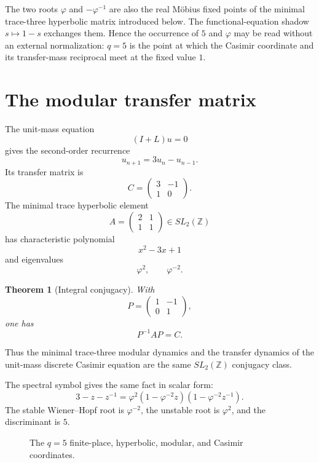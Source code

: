 \documentclass[11pt]{article}
\newtheorem{theorem}{Theorem}[section]
\theoremstyle{definition}
\theoremstyle{remark}
\DeclareMathOperator{\artanh}{artanh}
\begin{document}
The two roots \(\varphi\) and \(-\varphi^{-1}\) are also the real Möbius fixed points of the minimal trace-three hyperbolic matrix introduced below.  The functional-equation shadow \(s\mapsto1-s\) exchanges them.  Hence the occurrence of \(5\) and \(\varphi\) may be read without an external normalization: \(q=5\) is the point at which the Casimir coordinate and its transfer-mass reciprocal meet at the fixed value \(1\).

\section{The modular transfer matrix}

The unit-mass equation
\[
(I+L)u=0
\]
gives the second-order recurrence
\[
u_{n+1}=3u_n-u_{n-1}.
\]
Its transfer matrix is
\[
C=
\begin{pmatrix}
3&-1\\
1&0
\end{pmatrix}.
\]
The minimal trace hyperbolic element
\[
A=
\begin{pmatrix}
2&1\\
1&1
\end{pmatrix}
\in SL_2(\mathbb Z)
\]
has characteristic polynomial
\[
x^2-3x+1
\]
and eigenvalues
\[
\varphi^{2},\qquad \varphi^{-2}.
\]

\begin{theorem}[Integral conjugacy]
With
\[
P=
\begin{pmatrix}
1&-1\\
0&1
\end{pmatrix},
\]
one has
\[
\boxed{
P^{-1}AP=C.
}
\]
\end{theorem}

Thus the minimal trace-three modular dynamics and the transfer dynamics of the unit-mass discrete Casimir equation are the same \(SL_2(\mathbb Z)\) conjugacy class.

The spectral symbol gives the same fact in scalar form:
\[
3-z-z^{-1}
=
\varphi^2(1-\varphi^{-2}z)(1-\varphi^{-2}z^{-1}).
\]
The stable Wiener--Hopf root is \(\varphi^{-2}\), the unstable root is \(\varphi^2\), and the discriminant is \(5\).

\begin{figure}[t]
\centering
{}
\caption{The \(q=5\) finite-place, hyperbolic, modular, and Casimir coordinates.}
\end{figure}
\end{document}
